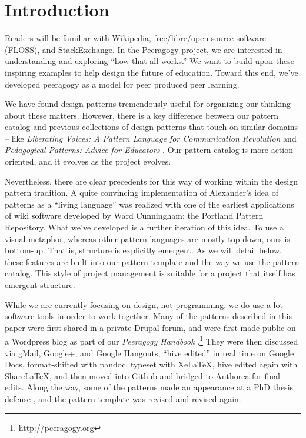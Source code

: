 \section{Introduction}\label{sec:Introduction}

Readers will be familiar with Wikipedia, free/libre/open source software (FLOSS), and StackExchange.  In the Peeragogy project, we are interested in understanding and exploring ``how that all works.''    We want to build upon these inspiring examples to help design the future of education.  Toward this end, we've developed peeragogy as a model for peer produced peer learning.

We have found design patterns tremendously useful for organizing our thinking about these matters.  However, there is a key difference between our pattern catalog and previous collections of design patterns that touch on similar domains -- like \emph{Liberating Voices: A Pattern Language for Communication Revolution} \cite{schuler2008liberating} and \emph{Pedagogical Patterns: Advice for Educators} \cite{bergin2012pedagogical}.  Our pattern catalog is more action-oriented, and it evolves as the project evolves.   

Nevertheless, there are clear precedents for this way of working within the design pattern tradition.  A quite convincing implementation of Alexander’s idea of patterns as a ``living language'' \cite[p.~xvii]{alexander1977pattern} was realized with one of the earliest applications of wiki software developed by Ward Cunningham: the Portland Pattern Repository. What we've developed is a further iteration of this idea. To use a visual metaphor, whereas other pattern languages are mostly top-down, ours is bottom-up.  That is, structure is explicitly emergent.  As we will detail below, these features are built into our pattern template and the way we use the pattern catalog.  This style of project management is suitable for a project that itself has emergent structure.

While we are currently focusing on design, not programming, we do use a lot software tools in order to work together.  Many of the patterns described in this paper were first shared in a private Drupal forum, and were first made public on a Wordpress blog as part of our \emph{Peeragogy Handbook} \cite{peeragogy-handbook}.\footnote{\url{http://peeragogy.org}}  They were then discussed via gMail, Google+, and Google Hangouts, ``hive edited'' in real time on Google Docs, format-shifted with pandoc, typeset with XeLaTeX, hive edited again with ShareLaTeX, and then moved into Github and bridged to Authorea for final edits.  Along the way, some of the patterns made an appearance at a PhD thesis defense \cite{corneli-thesis}, and the pattern template was revised and revised again.  


